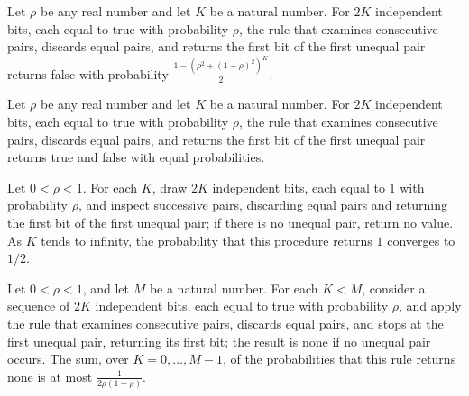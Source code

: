 \begin{theorem}
\label{Randomized.vonNeumann_tails}
\leanok
{}
Let $\rho$ be any real number and let $K$ be a natural number. For $2K$ independent
bits, each equal to true with probability $\rho$, the rule that examines consecutive
pairs, discards equal pairs, and returns the first bit of the first unequal pair returns
false with probability $\frac{1-(\rho^2+(1-\rho)^2)^K}{2}$.
\end{theorem}

\begin{theorem}
\label{Randomized.vonNeumann_heads_eq_tails}
\leanok
{}
Let $\rho$ be any real number and let $K$ be a natural number. For $2K$ independent
bits, each equal to true with probability $\rho$, the rule that examines consecutive
pairs, discards equal pairs, and returns the first bit of the first unequal pair returns
true and false with equal probabilities.
\end{theorem}

\begin{theorem}
\label{Randomized.tendsto_vonNeumann_heads}
\leanok
{}
Let $0<\rho<1$. For each $K$, draw $2K$ independent bits, each equal to $1$ with
probability $\rho$, and inspect successive pairs, discarding equal pairs and returning
the first bit of the first unequal pair; if there is no unequal pair, return no value.
As $K$ tends to infinity, the probability that this procedure returns $1$ converges to
$1/2$.
\end{theorem}

\begin{theorem}
\label{Randomized.vonNeumann_expected_pairs}
\leanok
{}
Let $0<\rho<1$, and let $M$ be a natural number. For each $K<M$, consider a sequence of
$2K$ independent bits, each equal to true with probability $\rho$, and apply the rule
that examines consecutive pairs, discards equal pairs, and stops at the first unequal
pair, returning its first bit; the result is none if no unequal pair occurs. The sum,
over $K=0,\ldots,M-1$, of the probabilities that this rule returns none is at most
$\frac{1}{2\rho(1-\rho)}$.
\end{theorem}

